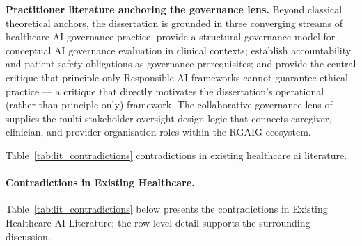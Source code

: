 \noindent\textbf{Practitioner literature anchoring the governance lens.} Beyond classical theoretical anchors, the dissertation is grounded in three converging streams of healthcare-AI governance practice. \cite{reddy2020governance} provide a structural governance model for conceptual AI governance evaluation in clinical contexts; \cite{habli2020aihealthcare} establish accountability and patient-safety obligations as governance prerequisites; and \cite{mittelstadt2019principles} provide the central critique that principle-only Responsible AI frameworks cannot guarantee ethical practice --- a critique that directly motivates the dissertation's operational (rather than principle-only) framework. The collaborative-governance lens of \cite{ansell2008collaborative} supplies the multi-stakeholder oversight design logic that connects caregiver, clinician, and provider-organisation roles within the RGAIG ecosystem.

\noindent Table~\ref{tab:lit_contradictions} contradictions in existing healthcare ai literature.

\paragraph{Contradictions in Existing Healthcare.}


\noindent Table~\ref{tab:lit_contradictions} below presents the contradictions in Existing Healthcare AI Literature; the row-level detail supports the surrounding discussion.

